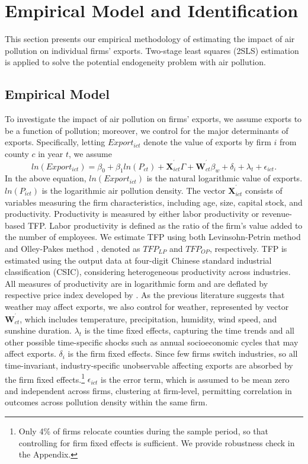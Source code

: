 \documentclass[12pt]{article}
\begin{document}
\section{Empirical Model and Identification}

\label{sec:empirical_strategy} This section presents our empirical
methodology of estimating the impact of air pollution on individual firms'
exports. Two-stage
least squares (2SLS)
estimation is applied to solve the potential endogeneity problem with
air pollution.

\subsection{Empirical Model}

To investigate the impact of air pollution on firms' exports, we assume
exports to be a function of pollution; moreover, we control for the major
determinants of exports. Specifically, letting $Export_{ict}$
denote the value of exports by firm $i$ from county $c$ in year $t$, we
assume 
\begin{equation}
ln(Export_{ict})=\beta _{0}+\beta _{1}ln(P_{ct})+\mathbf{X}%
_{ict}^{^{\prime }}\Gamma +\mathbf{W}_{ct}^{^{\prime }}\beta _{w}+\delta
_{i}+\lambda _{t}+\epsilon _{ict}.  \label{equ1}
\end{equation}%
In the above equation, $ln(Export_{ict})$ is the natural
logarithmic value of exports. $ln(P_{ict})$ is the logarithmic air
pollution density. The vector $\mathbf{X}_{ict}^{^{\prime }}$ consists of
variables measuring the firm characteristics, including age, size,
capital stock, and productivity. Productivity is measured by either labor
productivity or revenue-based TFP. Labor productivity is defined as the
ratio of the firm's value added to the number of employees. We estimate TFP
using both Levinsohn-Petrin method \citep{levinsohn2003estimating} and
Olley-Pakes method \citep{olley1996dynamics}, denoted as $TFP_{LP}$ and $%
TFP_{OP}$, respectively. TFP is estimated using the output data at four-digit
Chinese standard industrial classification (CSIC), considering heterogeneous
productivity across industries. All measures of productivity are in
logarithmic form and are deflated by respective price index developed by %
\citep{brandt2017wto}. As the previous literature %
\citep[e.g.,][]{jones2010climate} suggests that weather may affect exports,
we also control for weather, represented by vector $\mathbf{W}%
_{ct}^{^{\prime}}$, which includes temperature, precipitation, humidity,
wind speed, and sunshine duration. $\lambda _{t}$ is the time fixed effects,
capturing the time trends and all other possible time-specific shocks such
as annual socioeconomic cycles that may affect exports. $\delta _{i}$ is the
firm fixed effects. Since few
firms switch industries, so all time-invariant, industry-specific
unobservable affecting exports are absorbed by the firm fixed effects.\footnote{Only 4\% of firms relocate counties during the sample period, so that controlling for firm fixed effects is sufficient. We provide robustness check in the Appendix.}
$\epsilon _{ict}$ is
the error term, which is assumed to be mean zero and independent across
firms, clustering at firm-level, permitting correlation in outcomes across pollution density
within the same firm.
\end{document}
